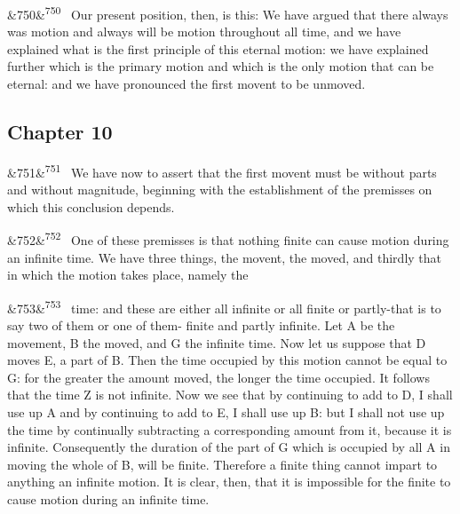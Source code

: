 \documentclass[12pt]{article}
\newcommand{\para}[1][]{\par\noindent\ifx&#1&\else\textsuperscript{\footnotesize #1}~\fi}
\begin{document}
\para[750] Our present position, then, is this: We have argued that there always was motion and always will be motion throughout all time, and we have explained what is the first principle of this eternal motion: we have explained further which is the primary motion and which is the only motion that can be eternal: and we have pronounced the first movent to be unmoved.

\subsection*{Chapter 10}

\para[751] We have now to assert that the first movent must be without parts and without magnitude, beginning with the establishment of the premisses on which this conclusion depends.

\para[752] One of these premisses is that nothing finite can cause motion during an infinite time. We have three things, the movent, the moved, and thirdly that in which the motion takes place, namely the

\para[753] time: and these are either all infinite or all finite or partly-that is to say two of them or one of them- finite and partly infinite. Let A be the movement, B the moved, and G the infinite time. Now let us suppose that D moves E, a part of B. Then the time occupied by this motion cannot be equal to G: for the greater the amount moved, the longer the time occupied. It follows that the time Z is not infinite. Now we see that by continuing to add to D, I shall use up A and by continuing to add to E, I shall use up B: but I shall not use up the time by continually subtracting a corresponding amount from it, because it is infinite. Consequently the duration of the part of G which is occupied by all A in moving the whole of B, will be finite. Therefore a finite thing cannot impart to anything an infinite motion. It is clear, then, that it is impossible for the finite to cause motion during an infinite time.
\end{document}
